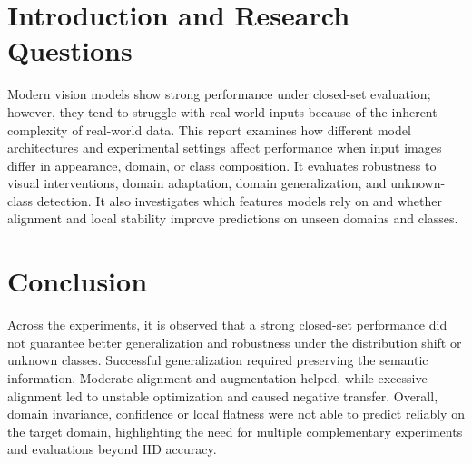 \documentclass{article}
\begin{document}
\section*{Introduction and Research Questions}
Modern vision models show strong performance under closed-set evaluation; however, they tend to struggle with real-world inputs because of the inherent complexity of real-world data. This report examines how different model architectures and experimental settings affect performance when input images differ in appearance, domain, or class composition. It evaluates robustness to visual interventions, domain adaptation, domain generalization, and unknown-class detection. It also investigates which features models rely on and whether alignment and local stability improve predictions on unseen domains and classes.









\FloatBarrier
\section{Conclusion}
Across the experiments, it is observed that a strong closed-set performance did not guarantee better generalization and robustness under the distribution shift or unknown classes. Successful generalization required preserving the semantic information. Moderate alignment and augmentation helped, while excessive alignment led to unstable optimization and caused negative transfer. Overall, domain invariance, confidence or local flatness were not able to predict reliably on the target domain, highlighting the need for multiple complementary experiments and evaluations beyond IID accuracy.

{\small


}



\end{document}
